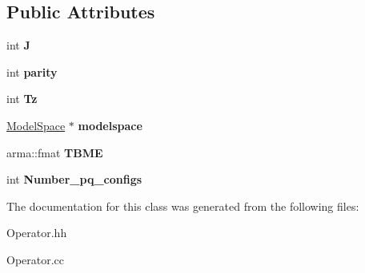 \subsection*{Public Attributes}
\begin{DoxyCompactItemize}
\item 
\hypertarget{classOperatorChannel_a6b28037deafabeee458f92bd2e71d01c}{int {\bfseries J}}\label{classOperatorChannel_a6b28037deafabeee458f92bd2e71d01c}

\item 
\hypertarget{classOperatorChannel_a4757b7d7df77cd1fd0e478fa12ebbe09}{int {\bfseries parity}}\label{classOperatorChannel_a4757b7d7df77cd1fd0e478fa12ebbe09}

\item 
\hypertarget{classOperatorChannel_a5f0579d7b73268968bf23536207e636e}{int {\bfseries Tz}}\label{classOperatorChannel_a5f0579d7b73268968bf23536207e636e}

\item 
\hypertarget{classOperatorChannel_a1e4f4c3953d68ab88e6aec1365ce3657}{\hyperlink{classModelSpace}{Model\-Space} $\ast$ {\bfseries modelspace}}\label{classOperatorChannel_a1e4f4c3953d68ab88e6aec1365ce3657}

\item 
\hypertarget{classOperatorChannel_a999987778d9dc3d162cca33f689d1c61}{arma\-::fmat {\bfseries T\-B\-M\-E}}\label{classOperatorChannel_a999987778d9dc3d162cca33f689d1c61}

\item 
\hypertarget{classOperatorChannel_a1762e83f7c4c26fc2c2e47165afc30db}{int {\bfseries Number\-\_\-pq\-\_\-configs}}\label{classOperatorChannel_a1762e83f7c4c26fc2c2e47165afc30db}

\end{DoxyCompactItemize}


The documentation for this class was generated from the following files\-:\begin{DoxyCompactItemize}
\item 
Operator.\-hh\item 
Operator.\-cc\end{DoxyCompactItemize}
